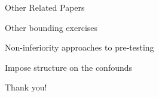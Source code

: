 \documentclass[aspectratio = 169, 13pt]{beamer}
\begin{document}
\begin{frame}{Other Related Papers}
	
	\begin{wideitemize}
		
		\item
		Other bounding exercises \citep{manski_how_2017, ye_negative_2021}
		
		\item
		Non-inferiority approaches to pre-testing \citep{bilinski_no_2018, dette_difference--differences_2020}
		
		\item
		Impose structure on the confounds \citep{freyaldenhoven_pre-event_2019}
	\end{wideitemize}
	    
\end{frame}







    



\appendix


\begin{frame}
	\centering
	Thank you!
\end{frame}
\end{document}
